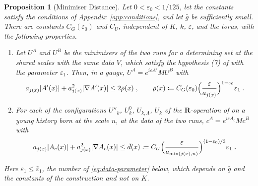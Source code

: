 \documentclass[11pt]{preprint}
\DeclarePairedDelimiter{\abs}{\lvert}{\rvert}
\numberwithin{equation}{section}
\newtheorem{proposition}[theorem]{Proposition}
\theoremstyle{definition}
\theoremstyle{remark}
\theoremstyle{plain}
\begin{document}
\begin{proposition}[Minimiser Distance]\label{prop:minimiser-distance}
Let $0 < \varepsilon_0 < 1/125$, let the constants satisfy the conditions of Appendix~\ref{app:conditions}, and let $\bar g$ be sufficiently small. There are constants $C_G(\varepsilon_0)$ and $C_U$, independent of $K$, $k$, $\varepsilon$, and the torus, with the following properties.
\begin{enumerate}[label=(\roman*)]
\item Let $U^A$ and $U^B$ be the minimisers of the two runs for a determining set at the shared scales with the same data $V$, which satisfy the hypothesis (7) of \cite[Theorem~1, p.~279]{BalabanVAR} with the parameter $\varepsilon_1$. Then, in a gauge, $U^A = e^{i\varepsilon A'}MU^B$ with
\begin{equation}\label{eq:minimiser-distance}
    a_{j(x)}\abs{A'(x)} + a_{j(x)}^2\abs{\nabla A'(x)} \leq 2\bar\rho(x)\;,
    \qquad
    \bar\rho(x) \coloneqq C_G(\varepsilon_0)\Bigl(\frac{\varepsilon}{a_{j(x)}}\Bigr)^{1-\varepsilon_0}\varepsilon_1\;.
\end{equation}
\item For each of the configurations $U''_k$, $U^0_k$, $U_{k,\Lambda}$, $U_k$ of the $\mathbf R$-operation of \cite[\S1]{BalabanLFR2} on a young history born at the scale $n$, at the data of the two runs, $c^A = e^{i\varepsilon A_c}Mc^B$ with
\begin{equation}\label{eq:coarse-side}
    a_{j(x)}\abs{A_c(x)} + a_{j(x)}^2\abs{\nabla A_c(x)} \leq \bar d(x) \coloneqq C_U\Bigl(\frac{\varepsilon}{a_{\min(j(x), n)}}\Bigr)^{(1-\varepsilon_0)/3}\varepsilon_1\;.
\end{equation}
\end{enumerate}
Here $\varepsilon_1 \leq \bar\varepsilon_1$, the number of \eqref{eq:data-parameter} below, which depends on $\bar g$ and the constants of the construction and not on $K$.
\end{proposition}
\end{document}
